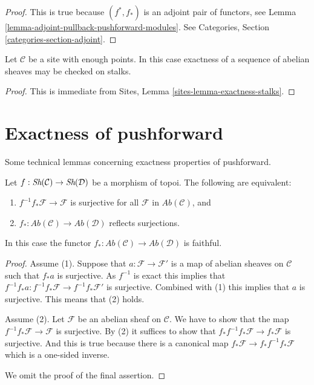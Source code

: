 \begin{proof}
This is true because $(f^*, f_*)$ is an adjoint pair
of functors, see
Lemma \ref{lemma-adjoint-pullback-pushforward-modules}.
See Categories, Section \ref{categories-section-adjoint}.
\end{proof}

\begin{lemma}
\label{lemma-check-exactness-stalks}
Let $\mathcal{C}$ be a site with enough points.
In this case exactness of a sequence of abelian sheaves may
be checked on stalks.
\end{lemma}

\begin{proof}
This is immediate from
Sites, Lemma \ref{sites-lemma-exactness-stalks}.
\end{proof}





\section{Exactness of pushforward}
\label{section-pushforward}

\noindent
Some technical lemmas concerning exactness properties of pushforward.

\begin{lemma}
\label{lemma-reflect-surjections}
Let $f : \mathop{\textit{Sh}}\nolimits(\mathcal{C}) \to \mathop{\textit{Sh}}\nolimits(\mathcal{D})$ be
a morphism of topoi. The following are equivalent:
\begin{enumerate}
\item $f^{-1}f_*\mathcal{F} \to \mathcal{F}$ is surjective for
all $\mathcal{F}$ in $\textit{Ab}(\mathcal{C})$, and
\item $f_* : \textit{Ab}(\mathcal{C}) \to \textit{Ab}(\mathcal{D})$
reflects surjections.
\end{enumerate}
In this case the functor
$f_* : \textit{Ab}(\mathcal{C}) \to \textit{Ab}(\mathcal{D})$
is faithful.
\end{lemma}

\begin{proof}
Assume (1). Suppose that $a : \mathcal{F} \to \mathcal{F}'$
is a map of abelian sheaves on $\mathcal{C}$ such that $f_*a$ is surjective.
As $f^{-1}$ is exact this implies that
$f^{-1}f_*a : f^{-1}f_*\mathcal{F} \to f^{-1}f_*\mathcal{F}'$
is surjective. Combined with (1) this implies that $a$ is surjective.
This means that (2) holds.

\medskip\noindent
Assume (2). Let $\mathcal{F}$ be an abelian sheaf on $\mathcal{C}$.
We have to show that the map $f^{-1}f_*\mathcal{F} \to \mathcal{F}$ is
surjective. By (2) it suffices to show that
$f_*f^{-1}f_*\mathcal{F} \to f_*\mathcal{F}$ is surjective.
And this is true because there is a canonical map
$f_*\mathcal{F} \to f_*f^{-1}f_*\mathcal{F}$ which is a one-sided inverse.

\medskip\noindent
We omit the proof of the final assertion.
\end{proof}

